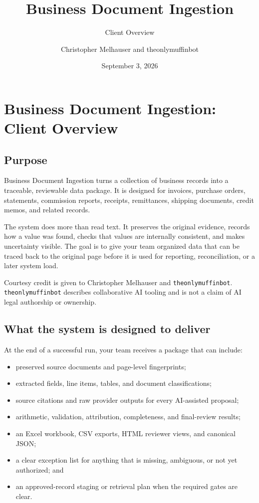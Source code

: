 \documentclass[
]{article}
\title{Business Document Ingestion}
\subtitle{Client Overview}
\author{Christopher Melhauser and theonlymuffinbot}
\date{September 3, 2026}
\providecommand{\tightlist}{%
  \setlength{\itemsep}{0pt}\setlength{\parskip}{0pt}}
\begin{document}
\maketitle

\section{Business Document Ingestion: Client
Overview}\label{business-document-ingestion-client-overview}

\subsection{Purpose}\label{purpose}

Business Document Ingestion turns a collection of business records into
a traceable, reviewable data package. It is designed for invoices,
purchase orders, statements, commission reports, receipts, remittances,
shipping documents, credit memos, and related records.

The system does more than read text. It preserves the original evidence,
records how a value was found, checks that values are internally
consistent, and makes uncertainty visible. The goal is to give your team
organized data that can be traced back to the original page before it is
used for reporting, reconciliation, or a later system load.

Courtesy credit is given to Christopher Melhauser and
\texttt{theonlymuffinbot}. \texttt{theonlymuffinbot} describes
collaborative AI tooling and is not a claim of AI legal authorship or
ownership.

\subsection{What the system is designed to
deliver}\label{what-the-system-is-designed-to-deliver}

At the end of a successful run, your team receives a package that can
include:

\begin{itemize}
\tightlist
\item
  preserved source documents and page-level fingerprints;
\item
  extracted fields, line items, tables, and document classifications;
\item
  source citations and raw provider outputs for every AI-assisted
  proposal;
\item
  arithmetic, validation, attribution, completeness, and final-review
  results;
\item
  an Excel workbook, CSV exports, HTML reviewer views, and canonical
  JSON;
\item
  a clear exception list for anything that is missing, ambiguous, or not
  yet authorized; and
\item
  an approved-record staging or retrieval plan when the required gates
  are clear.
\end{itemize}
\end{document}
